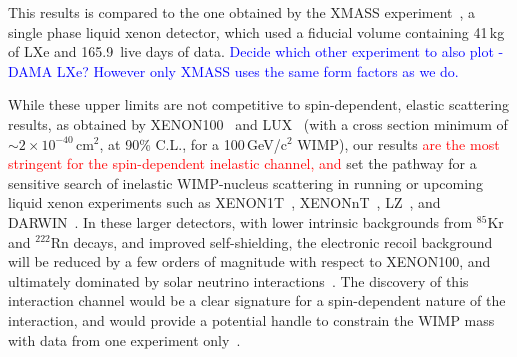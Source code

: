 This results is compared to the one obtained by the XMASS experiment~\cite{Uchida:2014cnn}, a single phase liquid xenon detector, which used a fiducial volume containing 41\,kg of LXe and 165.9~live days of data. \textcolor{blue}{Decide which other experiment to also plot - DAMA LXe? However only XMASS uses the same form factors as we do.}


While these upper limits are not competitive to spin-dependent, elastic scattering results, as obtained by XENON100~\cite{Aprile:2013doa} and LUX~\cite{Akerib:2016lao} (with a cross section minimum of $\sim2 \times 10^{-40}$\,cm$^{2}$, at 90\% C.L.,  for a 100\,GeV/c$^2$ WIMP), our results 
\textcolor{red} {are the most stringent for the spin-dependent inelastic channel, and}
set the pathway for a sensitive search of inelastic WIMP-nucleus scattering in running or upcoming liquid xenon experiments such as XENON1T~\cite{Aprile:2015uzo}, XENONnT~\cite{Aprile:2015uzo},  LZ~\cite{Akerib:2015cja}, and DARWIN~\cite{Aalbers:2016jon}. In these larger detectors, with lower intrinsic backgrounds from $^{85}$Kr and $^{222}$Rn decays, and improved self-shielding, the electronic recoil background will be reduced by a few orders of magnitude with respect to XENON100, and ultimately dominated by solar neutrino interactions~\cite{Baudis:2013qla}. 
The discovery of this interaction channel would be a clear signature for a spin-dependent nature of the interaction, and would provide a potential handle  to constrain the WIMP mass with data from one experiment only~\cite{Baudis:2013bba,McCabe:2016aof}.

\newpage

